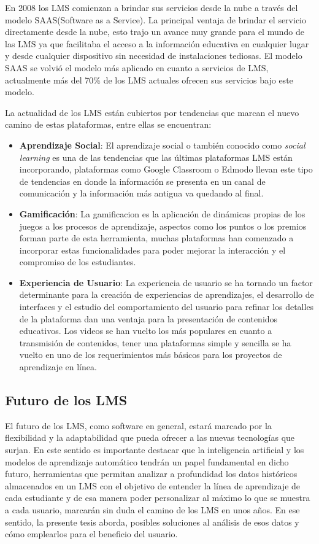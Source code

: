 En 2008 los LMS comienzan a brindar sus servicios desde la nube a través del modelo SAAS(Software as a Service). La principal ventaja de brindar el servicio directamente desde la nube, esto trajo un avance muy grande para el mundo de las LMS ya que facilitaba el acceso a la información educativa en cualquier lugar y desde cualquier dispositivo sin necesidad de instalaciones tediosas. El modelo SAAS se volvió el modelo más aplicado en cuanto a servicios de LMS, actualmente más del 70\% de los LMS actuales ofrecen sus servicios bajo este modelo.  


La actualidad de los LMS están cubiertos por tendencias que marcan el nuevo camino de estas plataformas, entre ellas se encuentran:
\begin{itemize}
    \item \textbf{Aprendizaje Social}: El aprendizaje social o también conocido como \textit{social learning} es una de las tendencias que las últimas plataformas LMS están incorporando, plataformas como Google Classroom o Edmodo llevan este tipo de tendencias en donde la información se presenta en un canal de comunicación y la información más antigua va quedando al final.
    \item \textbf{Gamificación}: La gamificacion es la aplicación de dinámicas propias de los juegos a los procesos de aprendizaje, aspectos como los puntos o los premios forman parte de esta herramienta, muchas plataformas han comenzado a incorporar estas funcionalidades para poder mejorar la interacción y el compromiso de los estudiantes.
    \item \textbf{Experiencia de Usuario}: La experiencia de usuario se ha tornado un factor determinante para la creación de experiencias de aprendizajes, el desarrollo de interfaces y el estudio del comportamiento del usuario para refinar los detalles de la plataforma dan una ventaja para la presentación de contenidos educativos. Los videos se han vuelto los más populares en cuanto a transmisión de contenidos, tener una plataformas simple y sencilla se ha vuelto en uno de los requerimientos más básicos para los proyectos de aprendizaje en línea.
\end{itemize}

\subsection{Futuro de los LMS}

El futuro de los LMS, como software en general, estará marcado por la flexibilidad y la adaptabilidad que pueda ofrecer a las nuevas tecnologías que surjan. En este sentido es importante destacar que la inteligencia artificial y los modelos de aprendizaje automático tendrán un papel fundamental en dicho futuro, herramientas que permitan analizar a profundidad los datos históricos almacenados en un LMS con el objetivo de entender la línea de aprendizaje de cada estudiante y de esa manera poder personalizar al máximo lo que se muestra a cada usuario, marcarán sin duda el camino de los LMS en unos años. En ese sentido, la presente tesis aborda, posibles soluciones al análisis de esos datos y cómo emplearlos para el beneficio del usuario.


